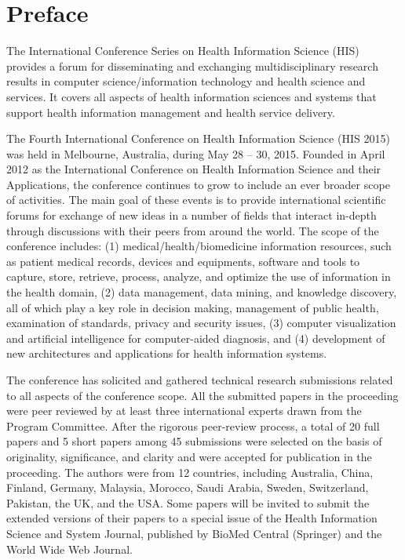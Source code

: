 \documentclass{llncs}
\begin{document}
%
\frontmatter          %
\setcounter{page}{5}
%
%
\chapter*{Preface}
%
The International Conference Series on Health Information Science (HIS) provides
a forum for disseminating and exchanging multidisciplinary research results
in computer science/information technology and health science and services. It
covers all aspects of health information sciences and systems that support health
information management and health service delivery.

The Fourth International Conference on Health Information Science (HIS 2015)
was held in Melbourne, Australia, during May 28 -- 30, 2015. Founded in April 2012 as the International Conference on Health Information Science and their Applications, the conference continues to grow to include an ever broader scope of activities. The main goal of these events is to provide international scientific forums for exchange of new ideas in a number of fields that interact in-depth through discussions with their peers from around
the world. The scope of the conference includes: (1) medical/health/biomedicine information resources, such as patient medical records, devices and equipments, software and tools to capture, store,
retrieve, process, analyze, and optimize the use of information in the health domain,
(2) data management, data mining, and knowledge discovery, all of which
play a key role in decision making, management of public health, examination of
standards, privacy and security issues, (3) computer visualization and artificial intelligence for computer-aided diagnosis, and (4) development of new architectures and applications for health information systems.

The conference has solicited and gathered technical research submissions related to all
aspects of the conference scope. All the submitted papers in the proceeding
were peer reviewed by at least three international experts drawn from the Program Committee. After the rigorous peer-review process, a total of 20 full papers and 5 short papers among 45 submissions were selected on the basis of originality, significance, and clarity and were accepted for publication in the proceeding. The authors were from 12 countries, including Australia, China, Finland, Germany, Malaysia, Morocco, Saudi Arabia, Sweden, Switzerland, Pakistan, the UK, and the USA. Some papers will be invited to submit the extended versions of their papers to a special issue of the Health Information Science and System Journal, published by BioMed Central (Springer) and the World Wide Web Journal.
\end{document}
